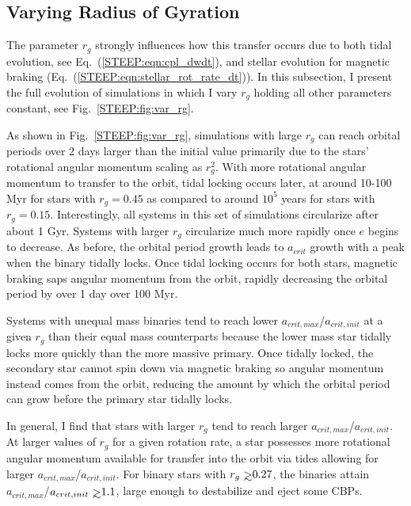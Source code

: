 \subsection{Varying Radius of Gyration} \label{STEEP:sec:var_rg}

The parameter $r_g$ strongly influences how this transfer occurs due to both tidal evolution, see Eq.~(\ref{STEEP:eqn:cpl_dwdt}), and stellar evolution for magnetic braking (Eq.~(\ref{STEEP:eqn:stellar_rot_rate_dt})).  In this subsection, I present the full evolution of simulations in which I vary $r_g$ holding all other parameters constant, see Fig.~\ref{STEEP:fig:var_rg}.

As shown in Fig.~\ref{STEEP:fig:var_rg}, simulations with large $r_g$ can reach orbital periods over 2 days larger than the initial value primarily due to the stars' rotational angular momentum scaling as $r_g^2$.  With more rotational angular momentum to transfer to the orbit, tidal locking occurs later, at around 10-100 Myr for stars with $r_g=0.45$ as compared to around $10^5$ years for stars with $r_g=0.15$.  Interestingly, all systems in this set of simulations circularize after about 1 Gyr.  Systems with larger $r_g$ circularize much more rapidly once $e$ begins to decrease.  As before, the orbital period growth leads to $a_{crit}$ growth with a peak when the binary tidally locks.  Once tidal locking occurs for both stars, magnetic braking saps angular momentum from the orbit, rapidly decreasing the orbital period by over 1 day over 100 Myr.

Systems with unequal mass binaries tend to reach lower $a_{crit,max}$/$a_{crit,init}$ at a given $r_g$ than their equal mass counterparts because the lower mass star tidally locks more quickly than the more massive primary.  Once tidally locked, the secondary star cannot spin down via magnetic braking so angular momentum instead comes from the orbit, reducing the amount by which the orbital period can grow before the primary star tidally locks.

In general, I find that stars with larger $r_g$ tend to reach larger $a_{crit,max}$/$a_{crit,init}$.  At larger values of $r_g$ for a given rotation rate, a star possesses more rotational angular momentum available for transfer into the orbit via tides allowing for larger $a_{crit,max}$/$a_{crit,init}$.  For binary stars with $r_g \gsim 0.27$, the binaries attain $a_{crit,max}$/$a_{crit,init} \gsim 1.1$, large enough to destabilize and eject some CBPs.  

